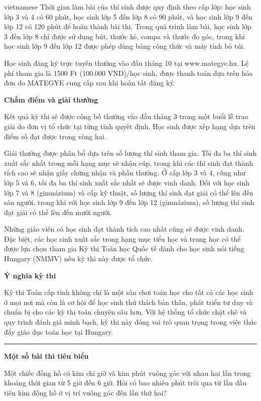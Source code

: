\documentclass{article}
\begin{document}
\begin{otherlanguage*}{vietnamese}
Thời gian làm bài của thí sinh được quy định theo cấp lớp: học sinh lớp 3 và 4 có 60 phút,
học sinh lớp 5 đến lớp 8 có 90 phút, và học sinh lớp 9 đến lớp 12 có 120 phút để hoàn thành bài thi.
Trong quá trình làm bài, học sinh lớp 3 đến lớp 8 chỉ được sử dụng bút, thước kẻ, compa và thước đo góc,
trong khi học sinh lớp 9 đến lớp 12 được phép dùng bảng công thức và máy tính bỏ túi.

Học sinh đăng ký trực tuyến thường vào đầu tháng 10 tại www.mategye.hu. Lệ phí tham gia là 1500 Ft (100.000 VND)/học sinh,
được thanh toán dựa trên hóa đơn do MATEGYE cung cấp sau khi hoàn tất đăng ký.

\textbf{Chấm điểm và giải thưởng}

Kết quả kỳ thi sẽ được công bố thường vào đầu tháng 3 trong một buổi lễ trao giải do đơn vị tổ chức tại từng tỉnh quyết định.
Học sinh được xếp hạng dựa trên điểm số đạt được trong vòng hai.

Giải thưởng được phân bổ dựa trên số lượng thí sinh tham gia. Tối đa ba thí sinh xuất sắc nhất trong mỗi hạng mục sẽ nhận cúp,
trong khi các thí sinh đạt thành tích cao sẽ nhận giấy chứng nhận và phần thưởng.
Ở cấp lớp 3 và 4, cũng như lớp 5 và 6, tối đa ba thí sinh xuất sắc nhất sẽ được vinh danh.
Đối với học sinh lớp 7 và 8 (gimnázium) và cấp kỹ thuật, số lượng thí sinh đạt giải có thể lên đến sáu người,
trong khi với học sinh lớp 9 đến lớp 12 (gimnázium), số lượng thí sinh đạt giải có thể lên đến mười người.

Những giáo viên có học sinh đạt thành tích cao nhất cũng sẽ được vinh danh.
Đặc biệt, các học sinh xuất sắc trong hạng mục tiểu học và trung học
có thể được lựa chọn tham gia Kỳ thi Toán học Quốc tế dành cho học sinh nói tiếng Hungary (NMMV) nếu kỳ thi này được tổ chức.

\textbf{Ý nghĩa kỳ thi}

Kỳ thi Toán cấp tỉnh không chỉ là một sân chơi toán học cho tất cả các học sinh ở mọi nơi mà còn là cơ hội để học sinh thử thách bản thân, phát triển tư duy và chuẩn bị cho các kỳ thi toán chuyên sâu hơn.
Với hệ thống tổ chức chặt chẽ và quy trình đánh giá minh bạch, kỳ thi này đóng vai trò quan trọng trong việc thúc đẩy giáo dục toán học tại Hungary.

\bigbreak

\noindent\rule{16.5cm}{0.4pt}

\textbf{Một số bài thi tiêu biểu}

\bigbreak

\begin{problem*}
    Một chiếc đồng hồ có kim chỉ giờ và kim phút vuông góc với nhau hai lần trong khoảng thời gian từ 5 giờ đến 6 giờ.
    Hỏi có bao nhiêu phút trôi qua từ lần đầu tiên kim đồng hồ ở vị trí vuông góc đến lần thứ hai?
\end{problem*}


\end{otherlanguage*}
\end{document}
